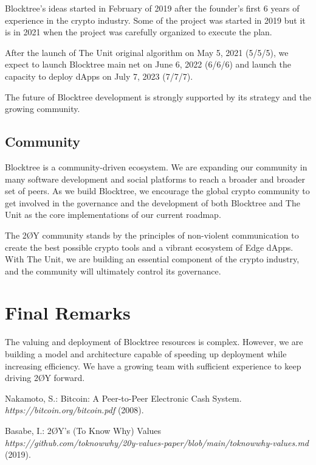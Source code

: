 \documentclass[12pt]{article}
\begin{document}
Blocktree's ideas started in February of 2019 after the founder's first 6 years of experience in the crypto industry. Some of the project was started in 2019 but it is in 2021 when the project was carefully organized to execute the plan.

After the launch of The Unit original algorithm on May 5, 2021 (5/5/5), we expect to launch Blocktree main net on June 6, 2022 (6/6/6) and launch the capacity to deploy dApps on July 7, 2023 (7/7/7).

The future of Blocktree development is strongly supported by its strategy and the growing community.


\subsection{Community}

Blocktree is a community-driven ecosystem. We are expanding our community in many software development and social platforms to reach a broader and broader set of peers. As we build Blocktree, we encourage the global crypto community to get involved in the governance and the development of both Blocktree and The Unit as the core implementations of our current roadmap.

The 2ØY community stands by the principles of non-violent communication to create the best possible crypto tools and a vibrant ecosystem of Edge dApps. With The Unit, we are building an essential component of the crypto industry, and the community will ultimately control its governance.

\section{Final Remarks}

The valuing and deployment of Blocktree resources is complex. However, we are building a model and architecture capable of speeding up deployment while increasing efficiency. We have a growing team with sufficient experience to keep driving 2ØY forward.


\begin{thebibliography}{[BLSWZ9]}


 Nakamoto, S.: Bitcoin: A Peer-to-Peer Electronic Cash System. \emph{https://bitcoin.org/bitcoin.pdf} (2008).


 Basabe, I.: 2ØY's (To Know Why) Values \\ \emph{https://github.com/toknowwhy/20y-values-paper/blob/main/toknowwhy-values.md} (2019).


\end{thebibliography}
\end{document}
